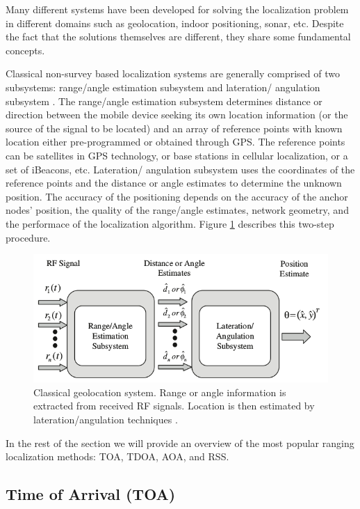 Many different systems have been developed for solving the localization problem in different domains such as geolocation, indoor positioning, sonar, etc. Despite the fact that the  solutions themselves are different, they share some fundamental concepts.

Classical non-survey based localization systems  are generally comprised of two subsystems: range/angle estimation subsystem and lateration/
angulation subsystem \cite{GeoLoc}. The range/angle estimation subsystem determines distance or direction between the  mobile device seeking its own location information (or the source of the signal to be located) and an array of reference points with known location  either pre-programmed or obtained through GPS. The reference points can be satellites in GPS technology, or base stations in cellular localization, or a set of iBeacons, etc. Lateration/
angulation subsystem uses the coordinates of the reference points and the distance or angle estimates to determine the unknown position.  The accuracy of the positioning depends on the accuracy of the anchor nodes’ position, the quality of the range/angle estimates, network geometry, and the performace of the localization algorithm. Figure \ref{fig:2step} describes this two-step procedure.


\begin{figure}[h]
\centering
\includegraphics{figures/localization_example}
\caption{Classical geolocation system. Range or angle information is extracted from received RF signals. Location is then estimated by lateration/angulation techniques \cite{GeoLoc}.}
\label{fig:2step}
\end{figure}



In the rest of the section we will provide an overview of the most popular ranging localization methods: TOA, TDOA, AOA, and RSS.



\subsection{Time of Arrival (TOA)}

